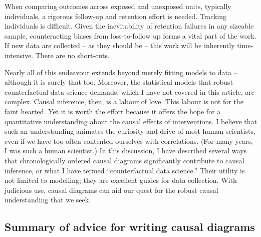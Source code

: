 \documentclass[
  singlecolumn]{report}
\begin{document}
When comparing outcomes across exposed and unexposed units, typically
individuals, a rigorous follow-up and retention effort is needed.
Tracking individuals is difficult. Given the inevitability of retention
failures in any sizeable sample, counteracting biases from
loss-to-follow up forms a vital part of the work. If new data are
collected -- as they should be -- this work will be inherently
time-intensive. There are no short-cuts.

Nearly all of this endeavour extends beyond merely fitting models to
data -- although it is surely that too. Moreover, the statistical models
that robust counterfactual data science demands, which I have not
covered in this article, are complex. Causal inference, then, is a
labour of love. This labour is not for the faint hearted. Yet it is
worth the effort because it offers the hope for a quantitative
understanding about the causal effects of interventions. I believe that
such an understanding animates the curiosity and drive of most human
scientists, even if we have too often contented ourselves with
correlations. (For many years, I was such a human scientist.) In this
discussion, I have described several ways that chronologically ordered
causal diagrams significantly contribute to causal inference, or what I
have termed ``counterfactual data science.'' Their utility is not
limited to modelling; they are excellent guides for data collection.
With judicious use, causal diagrams can aid our quest for the robust
causal understanding that we seek.

\hypertarget{summary-of-advice-for-writing-causal-diagrams}{%
\subsection{Summary of advice for writing causal
diagrams}\label{summary-of-advice-for-writing-causal-diagrams}}
\end{document}
